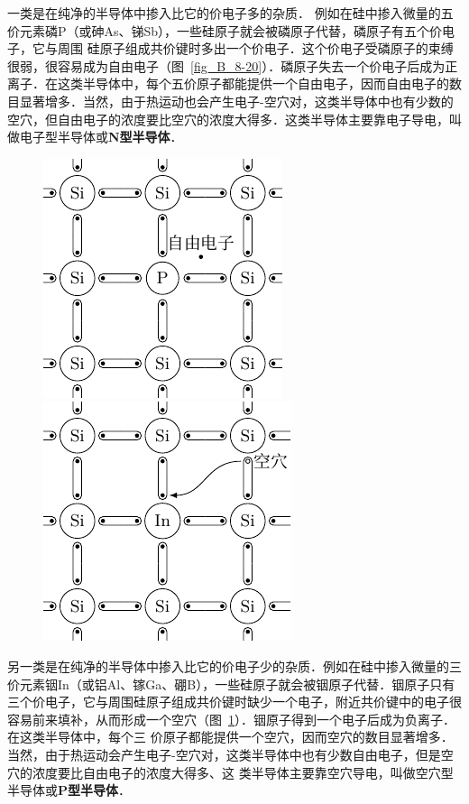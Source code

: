 一类是在纯净的半导体中掺入比它的价电子多的杂质．
例如在硅中掺入微量的五价元素磷P（或砷As、锑Sb），一些硅原子就会被磷原子代替，磷原子有五个价电子，它与周围
硅原子组成共价键时多出一个价电子．这个价电子受磷原子的束缚很弱，很容易成为自由电子（图~\ref{fig_B_8-20}）．磷原子失去一个价电子后成为正离子．在这类半导体中，每个五价原子都能提供一个自由电子，因而自由电子的数目显著增多．当然，由于热运动也会产生电子-空穴对，这类半导体中也有少数的空穴，但自由电子的浓度要比空穴的浓度大得多．这类半导体主要靠电子导电，叫做电子型半导体或\textbf{N型半导体}．
\begin{figure}[htbp]
    \centering
    \begin{minipage}[t]{0.48\textwidth}
        \centering
        \includegraphics{fig/B/8-20.pdf}
        \caption{}\label{fig_B_8-20}
    \end{minipage}
    \begin{minipage}[t]{0.48\textwidth}
        \centering
        \includegraphics{fig/B/8-21.pdf}
        \caption{}\label{fig_B_8-21}
    \end{minipage}
\end{figure}

另一类是在纯净的半导体中掺入比它的价电子少的杂质．例如在硅中掺入微量的三价元素铟In（或铝Al、镓Ga、硼B），一些硅原子就会被铟原子代替．铟原子只有三个价电子，它与周围硅原子组成共价键时缺少一个电子，附近共价键中的电子很容易前来填补，从而形成一个空穴（图~\ref{fig_B_8-21}）．铟原子得到一个电子后成为负离子．在这类半导体中，每个三
价原子都能提供一个空穴，因而空穴的数目显著增多．当然，由于热运动会产生电子-空穴对，这类半导体中也有少数自由电子，但是空穴的浓度要比自由电子的浓度大得多、这
类半导体主要靠空穴导电，叫做空穴型半导体或\textbf{P型半导体}．

